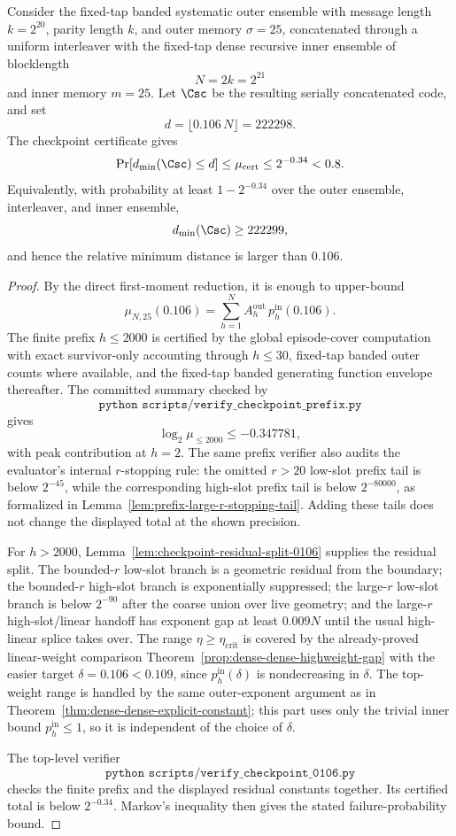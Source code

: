 \begin{theorem}
\label{thm:finite-dense-dense-checkpoint-0106}
Consider the fixed-tap banded systematic outer ensemble with message length \(k=2^{20}\), parity length \(k\), and
outer memory \(\sigma=25\), concatenated through a uniform interleaver with the fixed-tap dense recursive inner ensemble of
blocklength
\[
N=2k=2^{21}
\]
and inner memory \(m=25\).  Let \(\Csc\) be the resulting serially concatenated code, and set
\[
d=\lfloor 0.106\,N\rfloor=222298.
\]
The checkpoint certificate gives
\[
\Pr[d_{\min}(\Csc)\le d]
\le
\mu_{\mathrm{cert}}
\le
2^{-0.34}
<0.8.
\]
Equivalently, with probability at least \(1-2^{-0.34}\) over the outer ensemble, interleaver, and inner ensemble,
\[
d_{\min}(\Csc)\ge222299,
\]
and hence the relative minimum distance is larger than \(0.106\).
\end{theorem}

\begin{proof}
By the direct first-moment reduction, it is enough to upper-bound
\[
\mu_{N,25}(0.106)
=
\sum_{h=1}^{N} A_h^{\mathrm{out}}\,p_h^{\mathrm{in}}(0.106).
\]
The finite prefix \(h\le2000\) is certified by the global episode-cover computation with exact survivor-only
accounting through \(h\le30\), fixed-tap banded outer counts where available, and the fixed-tap banded generating
function envelope thereafter.  The committed summary checked by
\[
\texttt{python scripts/verify\_checkpoint\_prefix.py}
\]
gives
\[
\log_2 \mu_{\le2000}\le -0.347781,
\]
with peak contribution at \(h=2\).  The same prefix verifier also audits the evaluator's internal \(r\)-stopping rule:
the omitted \(r>20\) low-slot prefix tail is below \(2^{-45}\), while the corresponding high-slot prefix tail is below
\(2^{-80000}\), as formalized in Lemma~\ref{lem:prefix-large-r-stopping-tail}.  Adding these tails does not change the
displayed total at the shown precision.

For \(h>2000\), Lemma~\ref{lem:checkpoint-residual-split-0106} supplies the residual split.  The bounded-\(r\)
low-slot branch is a geometric residual from the boundary; the bounded-\(r\) high-slot branch is exponentially
suppressed; the large-\(r\) low-slot branch is below \(2^{-90}\) after the coarse union over live geometry; and the
large-\(r\) high-slot/linear handoff has exponent gap at least \(0.009N\) until the usual high-linear splice takes
over.  The range \(\eta\ge\eta_{\mathrm{crit}}\) is covered by the already-proved linear-weight comparison
Theorem~\ref{prop:dense-dense-highweight-gap} with the easier target \(\delta=0.106<0.109\), since
\(p_h^{\mathrm{in}}(\delta)\) is nondecreasing in \(\delta\).  The top-weight range is handled by the same
outer-exponent argument as in Theorem~\ref{thm:dense-dense-explicit-constant}; this part uses only the trivial
inner bound \(p_h^{\mathrm{in}}\le1\), so it is independent of the choice of \(\delta\).

The top-level verifier
\[
\texttt{python scripts/verify\_checkpoint\_0106.py}
\]
checks the finite prefix and the displayed residual constants together.  Its certified total is below \(2^{-0.34}\).
Markov's inequality then gives the stated failure-probability bound.
\end{proof}

